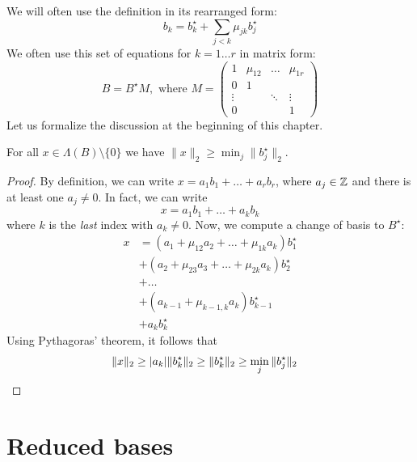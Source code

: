 We will often use the definition in its rearranged form:
\[
  b_k = b_k^\star + \sum_{j < k} \mu_{jk} b_j^\star
\]
We often use this set of equations for $k = 1\dots r$ in matrix form:
\[
  B = B^\star M, \text{ where } M = \begin{pmatrix}
                                      1 & \mu_{12} & \dots  & \mu_{1r} \\
                                      0 &    1     &        & \\
                                      \vdots &     & \ddots & \vdots \\
                                      0 &          &        &   1
                                    \end{pmatrix}
\]
Let us formalize the discussion at the beginning of this chapter.
\begin{lemma}
  \label{lemma:svp-lower-bound-gso}
  For all $x \in \Lambda(B) \setminus \{0\}$ we have $\|x\|_2 \geq \min_j \|b_j^\star\|_2$.
\end{lemma}
\begin{proof}
  By definition, we can write $x = a_1 b_1 + \dots + a_r b_r$,
  where $a_j \in \mathbb{Z}$ and there is at least one $a_j \neq 0$.
  In fact, we can write
  \[
    x = a_1 b_1 + \dots + a_k b_k
  \]
  where $k$ is the \emph{last} index with $a_k \neq 0$.
  Now, we compute a change of basis to $B^\star$:
  \begin{align*}
    x &= (a_1 + \mu_{12} a_2 + \dots + \mu_{1k} a_k) b_1^\star \\
      &+ (a_2 + \mu_{23} a_3 + \dots + \mu_{2k} a_k) b_2^\star \\
      &+ \dots \\
      &+ (a_{k-1} + \mu_{k-1,k} a_k) b_{k-1}^\star \\
      &+ a_k b_k^\star
  \end{align*}
  Using Pythagoras' theorem, it follows that
  \begin{align*}
    \|x\|_2 &\geq |a_k| \|b_k^\star\|_2 \geq \|b_k^\star\|_2 \geq \min_j \|b_j^\star\|_2 \qedhere
  \end{align*}
\end{proof}



\section{Reduced bases}

